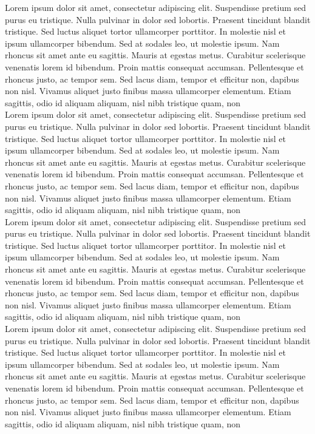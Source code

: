 \documentclass[10pt]{article}
\begin{document}
Lorem ipsum dolor sit amet, consectetur adipiscing elit. Suspendisse pretium sed purus eu tristique. Nulla pulvinar in dolor sed lobortis. Praesent tincidunt blandit tristique. Sed luctus aliquet tortor ullamcorper porttitor. In molestie nisl et ipsum ullamcorper bibendum. Sed at sodales leo, ut molestie ipsum. Nam rhoncus sit amet ante eu sagittis. Mauris at egestas metus. Curabitur scelerisque venenatis lorem id bibendum. Proin mattis consequat accumsan. Pellentesque et rhoncus justo, ac tempor sem. Sed lacus diam, tempor et efficitur non, dapibus non nisl. Vivamus aliquet justo finibus massa ullamcorper elementum. Etiam sagittis, odio id aliquam aliquam, nisl nibh tristique quam, non\\
Lorem ipsum dolor sit amet, consectetur adipiscing elit. Suspendisse pretium sed purus eu tristique. Nulla pulvinar in dolor sed lobortis. Praesent tincidunt blandit tristique. Sed luctus aliquet tortor ullamcorper porttitor. In molestie nisl et ipsum ullamcorper bibendum. Sed at sodales leo, ut molestie ipsum. Nam rhoncus sit amet ante eu sagittis. Mauris at egestas metus. Curabitur scelerisque venenatis lorem id bibendum. Proin mattis consequat accumsan. Pellentesque et rhoncus justo, ac tempor sem. Sed lacus diam, tempor et efficitur non, dapibus non nisl. Vivamus aliquet justo finibus massa ullamcorper elementum. Etiam sagittis, odio id aliquam aliquam, nisl nibh tristique quam, non\\
Lorem ipsum dolor sit amet, consectetur adipiscing elit. Suspendisse pretium sed purus eu tristique. Nulla pulvinar in dolor sed lobortis. Praesent tincidunt blandit tristique. Sed luctus aliquet tortor ullamcorper porttitor. In molestie nisl et ipsum ullamcorper bibendum. Sed at sodales leo, ut molestie ipsum. Nam rhoncus sit amet ante eu sagittis. Mauris at egestas metus. Curabitur scelerisque venenatis lorem id bibendum. Proin mattis consequat accumsan. Pellentesque et rhoncus justo, ac tempor sem. Sed lacus diam, tempor et efficitur non, dapibus non nisl. Vivamus aliquet justo finibus massa ullamcorper elementum. Etiam sagittis, odio id aliquam aliquam, nisl nibh tristique quam, non\\
Lorem ipsum dolor sit amet, consectetur adipiscing elit. Suspendisse pretium sed purus eu tristique. Nulla pulvinar in dolor sed lobortis. Praesent tincidunt blandit tristique. Sed luctus aliquet tortor ullamcorper porttitor. In molestie nisl et ipsum ullamcorper bibendum. Sed at sodales leo, ut molestie ipsum. Nam rhoncus sit amet ante eu sagittis. Mauris at egestas metus. Curabitur scelerisque venenatis lorem id bibendum. Proin mattis consequat accumsan. Pellentesque et rhoncus justo, ac tempor sem. Sed lacus diam, tempor et efficitur non, dapibus non nisl. Vivamus aliquet justo finibus massa ullamcorper elementum. Etiam sagittis, odio id aliquam aliquam, nisl nibh tristique quam, non\\
\end{document}
